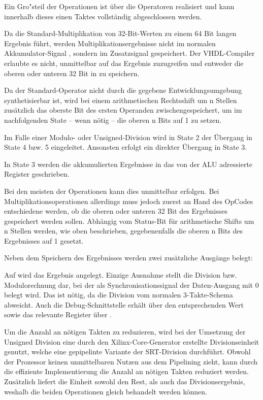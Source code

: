 Ein Gro"steil der Operationen ist \"uber die  Operatoren realisiert und kann innerhalb dieses einen Taktes vollst\"andig abgeschlossen werden.

Da die Standard-Multiplikation von 32-Bit-Werten zu einem 64 Bit langen Ergebnis f\"uhrt, werden Multiplikationsergebnisse nicht im normalen Akkumulator-Signal , sondern im Zusatzsignal  gespeichert. Der VHDL-Compiler erlaubte es nicht, unmittelbar auf das Ergebnis zuzugreifen und entweder die oberen oder unteren 32 Bit in  zu speichern.\vspace{10pt}

Da der Standard-Operator  nicht durch die gegebene Entwicklungsumgebung synthetisierbar ist, wird bei einem arithmetischen Rechtsshift um {n} Stellen zus\"atzlich das oberste Bit des ersten Operanden zwischengespeichert, um im nachfolgenden State – wenn n\"otig – die oberen {n} Bits auf {1} zu setzen.\vspace{10pt}

Im Falle einer Modulo- oder Unsigned-Division wird in State 2 der \"Ubergang in State 4 bzw. 5 eingeleitet. Ansonsten erfolgt ein direkter \"Ubergang in State 3.

In State 3 werden die akkumulierten Ergebnisse in das von der ALU adressierte Register geschrieben.

Bei den meisten der Operationen kann dies unmittelbar erfolgen. Bei Multiplikationsoperationen allerdings muss jedoch zuerst an Hand des OpCodes entschiedene werden, ob die oberen oder unteren 32 Bit des Ergebnisses gespeichert werden sollen. Abh\"angig vom Status-Bit f\"ur arithmetische Shifts um {n} Stellen werden, wie oben beschrieben, gegebenenfalls die oberen n Bits des Ergebnisses auf {1} gesetzt.\vspace{10pt}


Neben dem Speichern des Ergebnisses werden zwei zus\"atzliche Ausg\"ange belegt:

Auf  wird das Ergebnis angelegt. Einzige Ausnahme stellt die Division bzw. Modulorechnung dar, bei der als Synchronisationssignal der Daten-Ausgang mit 0 belegt wird. Das ist n\"otig, da die Division vom normalen 3-Takte-Schema abweicht.
Auch die Debug-Schnittstelle erh\"alt \"uber  den entsprechenden Wert sowie das relevante Register \"uber .

Um die Anzahl an n\"otigen Takten zu reduzieren, wird bei der Umsetzung der Unsigned Division eine durch den Xilinx-Core-Generator erstellte Divisionseinheit genutzt, welche eine gepipelinte Variante der SRT-Division durchf\"uhrt. Obwohl der Prozessor keinen unmittelbaren Nutzen aus dem Pipelining zieht, kann durch die effiziente Implementierung die Anzahl an n\"otigen Takten reduziert werden. Zus\"atzlich liefert die Einheit sowohl den Rest, als auch das Divisionsergebnis, weshalb die beiden Operationen gleich behandelt werden k\"onnen.


